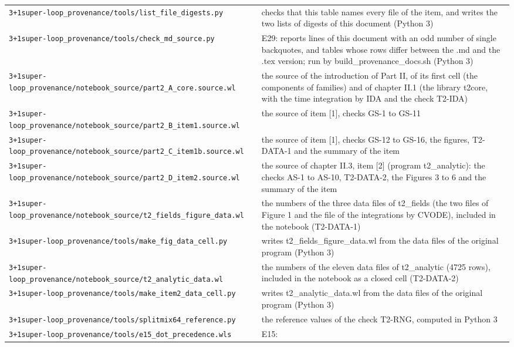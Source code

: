 \documentclass[
  10pt,
]{article}
\begin{document}
\begin{longtable}[]{@{}
  >{\raggedright\arraybackslash}p{}
  >{\raggedright\arraybackslash}p{}@{}}
\texttt{3+1super-loop\_provenance/tools/list\_file\_digests.py} & checks
that this table names every file of the item, and writes the two lists
of digests of this document (Python 3) \\
\texttt{3+1super-loop\_provenance/tools/check\_md\_source.py} & E29:
reports lines of this document with an odd number of single backquotes,
and tables whose rows differ between the .md and the .tex version; run
by build\_provenance\_docs.sh (Python 3) \\
\texttt{3+1super-loop\_provenance/notebook\_source/part2\_A\_core.source.wl}
& the source of the introduction of Part II, of its first cell (the
components of families) and of chapter II.1 (the library t2core, with
the time integration by IDA and the check T2-IDA) \\
\texttt{3+1super-loop\_provenance/notebook\_source/part2\_B\_item1.source.wl}
& the source of item {[}1{]}, checks GS-1 to GS-11 \\
\texttt{3+1super-loop\_provenance/notebook\_source/part2\_C\_item1b.source.wl}
& the source of item {[}1{]}, checks GS-12 to GS-16, the figures,
T2-DATA-1 and the summary of the item \\
\texttt{3+1super-loop\_provenance/notebook\_source/part2\_D\_item2.source.wl}
& the source of chapter II.3, item {[}2{]} (program t2\_analytic): the
checks AS-1 to AS-10, T2-DATA-2, the Figures 3 to 6 and the summary of
the item \\
\texttt{3+1super-loop\_provenance/notebook\_source/t2\_fields\_figure\_data.wl}
& the numbers of the three data files of t2\_fields (the two files of
Figure 1 and the file of the integrations by CVODE), included in the
notebook (T2-DATA-1) \\
\texttt{3+1super-loop\_provenance/tools/make\_fig\_data\_cell.py} &
writes t2\_fields\_figure\_data.wl from the data files of the original
program (Python 3) \\
\texttt{3+1super-loop\_provenance/notebook\_source/t2\_analytic\_data.wl}
& the numbers of the eleven data files of t2\_analytic (4725 rows),
included in the notebook as a closed cell (T2-DATA-2) \\
\texttt{3+1super-loop\_provenance/tools/make\_item2\_data\_cell.py} &
writes t2\_analytic\_data.wl from the data files of the original program
(Python 3) \\
\texttt{3+1super-loop\_provenance/tools/splitmix64\_reference.py} & the
reference values of the check T2-RNG, computed in Python 3 \\
\texttt{3+1super-loop\_provenance/tools/e15\_dot\_precedence.wls} & E15:

\end{longtable}
\end{document}
